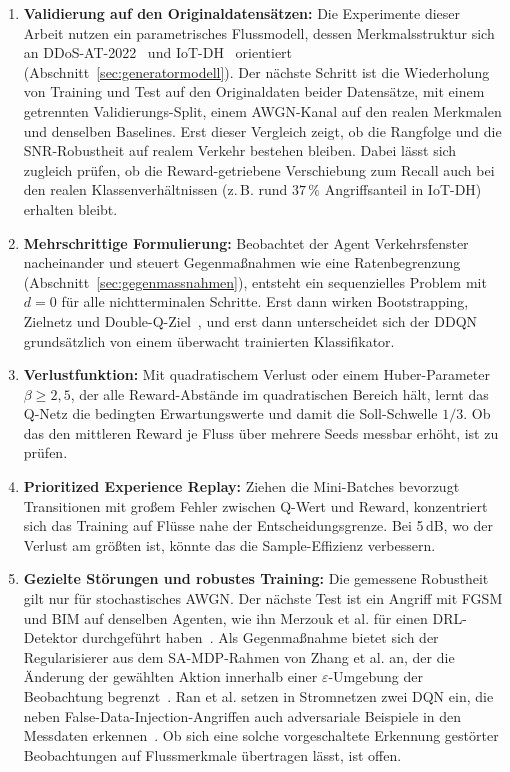 \begin{enumerate}
    \item \textbf{Validierung auf den Originaldatensätzen:} Die Experimente dieser Arbeit nutzen ein parametrisches Flussmodell, dessen Merkmalsstruktur sich an \mbox{DDoS-AT-2022}~\autocite{mittalDDoSAT2022DistributedDenial2023} und \mbox{IoT-DH}~\autocite{saifIoTDHDatasetClassification2024} orientiert (Abschnitt~\ref{sec:generatormodell}). Der nächste Schritt ist die Wiederholung von Training und Test auf den Originaldaten beider Datensätze, mit einem getrennten Validierungs-Split, einem AWGN-Kanal auf den realen Merkmalen und denselben Baselines. Erst dieser Vergleich zeigt, ob die Rangfolge und die SNR-Robustheit auf realem Verkehr bestehen bleiben. Dabei lässt sich zugleich prüfen, ob die Reward-getriebene Verschiebung zum Recall auch bei den realen Klassenverhältnissen (z.\,B. rund $37\,\%$ Angriffsanteil in \mbox{IoT-DH}) erhalten bleibt.
    \item \textbf{Mehrschrittige Formulierung:} Beobachtet der Agent Verkehrsfenster nacheinander und steuert Gegenmaßnahmen wie eine Ratenbegrenzung (Abschnitt~\ref{sec:gegenmassnahmen}), entsteht ein sequenzielles Problem mit $d=0$ für alle nichtterminalen Schritte. Erst dann wirken Bootstrapping, Zielnetz und Double-Q-Ziel~\autocite{vanhasseltDeepReinforcementLearning2016}, und erst dann unterscheidet sich der DDQN grundsätzlich von einem überwacht trainierten Klassifikator.
    \item \textbf{Verlustfunktion:} Mit quadratischem Verlust oder einem Huber-Parameter $\beta\ge2{,}5$, der alle Reward-Abstände im quadratischen Bereich hält, lernt das Q-Netz die bedingten Erwartungswerte und damit die Soll-Schwelle $1/3$. Ob das den mittleren Reward je Fluss über mehrere Seeds messbar erhöht, ist zu prüfen.
    \item \textbf{Prioritized Experience Replay:} Ziehen die Mini-Batches bevorzugt Transitionen mit großem Fehler zwischen Q-Wert und Reward, konzentriert sich das Training auf Flüsse nahe der Entscheidungsgrenze. Bei 5\,dB, wo der Verlust am größten ist, könnte das die Sample-Effizienz verbessern.
    \item \textbf{Gezielte Störungen und robustes Training:} Die gemessene Robustheit gilt nur für stochastisches AWGN. Der nächste Test ist ein Angriff mit FGSM und BIM auf denselben Agenten, wie ihn Merzouk et al. für einen DRL-Detektor durchgeführt haben~\autocite{merzoukEvadingDeepReinforcement2022}. Als Gegenmaßnahme bietet sich der Regularisierer aus dem SA-MDP-Rahmen von Zhang et al. an, der die Änderung der gewählten Aktion innerhalb einer $\varepsilon$-Umgebung der Beobachtung begrenzt~\autocite{zhangRobustDeepReinforcement2020}. Ran et al. setzen in Stromnetzen zwei DQN ein, die neben False-Data-Injection-Angriffen auch adversariale Beispiele in den Messdaten erkennen~\autocite{ranRobustDataDrivenAdversarial2024}. Ob sich eine solche vorgeschaltete Erkennung gestörter Beobachtungen auf Flussmerkmale übertragen lässt, ist offen.

\end{enumerate}
